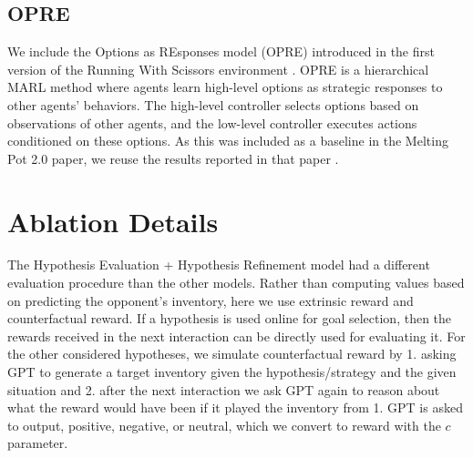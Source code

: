 \documentclass{article} %
\begin{document}
\subsection{OPRE}

We include the Options as REsponses model (OPRE) introduced in the first version of the Running With Scissors environment \citep{vezhnevets2020options}. OPRE is a hierarchical MARL method where agents learn high-level options as strategic responses to other agents' behaviors. The high-level controller selects options based on observations of other agents, and the low-level controller executes actions conditioned on these options. As this was included as a baseline in the Melting Pot 2.0 paper, we reuse the results reported in that paper \citep{agapiou2022melting}. 

\section{Ablation Details}

The Hypothesis Evaluation + Hypothesis Refinement model had a different evaluation procedure than the other models. Rather than computing values based on predicting the opponent's inventory, here we use extrinsic reward and counterfactual reward. If a hypothesis is used online for goal selection, then the rewards received in the next interaction can be directly used for evaluating it. For the other considered hypotheses, we simulate counterfactual reward by 1. asking GPT to generate a target inventory given the hypothesis/strategy and the given situation and 2. after the next interaction we ask GPT again to reason about what the reward would have been if it played the inventory from 1. GPT is asked to output, positive, negative, or neutral, which we convert to reward with the $c$ parameter.


\end{document}
